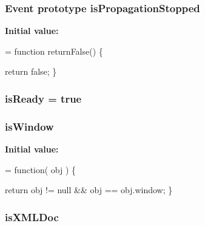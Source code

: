 \hypertarget{jquery-1_810_82-vsdoc_8js_a67f2430529d27bb55dbfa279dc2899ea}{
\subsubsection[{is\-Propagation\-Stopped}]{ {\bf Event} {\bf prototype} is\-Propagation\-Stopped}}\label{jquery-1_810_82-vsdoc_8js_a67f2430529d27bb55dbfa279dc2899ea}
{\bfseries Initial value\-:}
\begin{DoxyCode}
= \textcolor{keyword}{function} returnFalse() \{


    \textcolor{keywordflow}{return} \textcolor{keyword}{false};
\}
\end{DoxyCode}
\hypertarget{jquery-1_810_82-vsdoc_8js_a797716c9b47d0a75c110b3852c7f25af}{
\subsubsection[{is\-Ready}]{ is\-Ready = true}}\label{jquery-1_810_82-vsdoc_8js_a797716c9b47d0a75c110b3852c7f25af}
\hypertarget{jquery-1_810_82-vsdoc_8js_a6f58346d2509049e6186d923c99f005a}{
\subsubsection[{is\-Window}]{ is\-Window}}\label{jquery-1_810_82-vsdoc_8js_a6f58346d2509049e6186d923c99f005a}
{\bfseries Initial value\-:}
\begin{DoxyCode}
= \textcolor{keyword}{function}( obj ) \{


        
        \textcolor{keywordflow}{return} obj != null && obj == obj.window;
    \}
\end{DoxyCode}
\hypertarget{jquery-1_810_82-vsdoc_8js_acf4730466ce2c301378ee112fdba9139}{
\subsubsection[{is\-X\-M\-L\-Doc}]{ is\-X\-M\-L\-Doc}}\label{jquery-1_810_82-vsdoc_8js_acf4730466ce2c301378ee112fdba9139}
